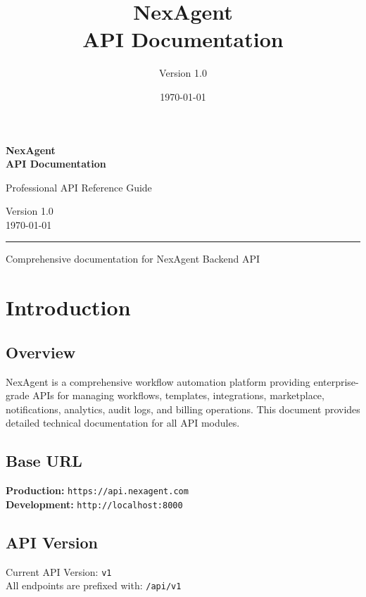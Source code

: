 \documentclass[11pt,a4paper]{report}
\title{\textbf{\Huge NexAgent}\\[0.5cm]\LARGE API Documentation}
\author{Version 1.0}
\date{\today}
\begin{document}
\begin{titlepage}
    \centering
    \vspace*{3cm}
    
    {\Huge\bfseries NexAgent\\[0.5cm]}
    {\LARGE\bfseries API Documentation\\[2cm]}
    
    {\Large Professional API Reference Guide\\[1cm]}
    
    \vfill
    
    {\large Version 1.0\\[0.5cm]}
    {\large \today\\[2cm]}
    
    \hrule
    \vspace{0.5cm}
    {\small Comprehensive documentation for NexAgent Backend API}
    
\end{titlepage}

\tableofcontents
\newpage

\chapter{Introduction}

\section{Overview}

NexAgent is a comprehensive workflow automation platform providing enterprise-grade APIs for managing workflows, templates, integrations, marketplace, notifications, analytics, audit logs, and billing operations. This document provides detailed technical documentation for all API modules.

\section{Base URL}

\textbf{Production:} \texttt{https://api.nexagent.com}\\
\textbf{Development:} \texttt{http://localhost:8000}

\section{API Version}

Current API Version: \texttt{v1}\\
All endpoints are prefixed with: \texttt{/api/v1}
\end{document}
